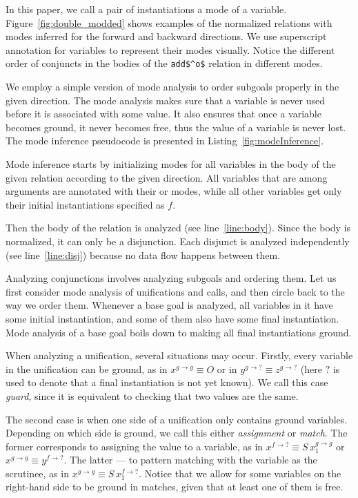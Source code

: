 In this paper, we call a pair of instantiations a mode of a variable.
Figure~\ref{fig:double_modded} shows examples of the normalized \mk relations with modes inferred for the forward and backward directions.
We use superscript annotation for variables to represent their modes visually.
Notice the different order of conjuncts in the bodies of the \lstinline{add$^o$} relation in different modes.


We employ a simple version of mode analysis to order subgoals properly in the given direction.
The mode analysis makes sure that a variable is never used before it is associated with some value.
It also ensures that once a variable becomes ground, it never becomes free, thus the value of a variable is never lost.
The mode inference pseudocode is presented in Listing~\ref{fig:modeInference}.






Mode inference starts by initializing modes for all variables in the body of the given relation according to the given direction.
All variables that are among arguments are annotated with their \inm or \outm modes, while all other variables get only their initial instantiations specified as $f$.

Then the body of the relation is analyzed (see line~\ref{line:body}).
Since the body is normalized, it can only be a disjunction.
Each disjunct is analyzed independently (see line~\ref{line:disj}) because no data flow happens between them.

Analyzing conjunctions involves analyzing subgoals and ordering them.
Let us first consider mode analysis of unifications and calls, and then circle back to the way we order them.
Whenever a base goal is analyzed, all variables in it have some initial instantiation, and some of them also have some final instantiation.
Mode analysis of a base goal boils down to making all final instantiations ground.

When analyzing a unification, several situations may occur.
Firstly, every variable in the unification can be ground, as in $x^{g \rightarrow g} \equiv O$ or in $y^{g \rightarrow ?} \equiv z^{g \rightarrow ?}$ (here $?$ is used to denote that a final instantiation is not yet known).
We call this case \emph{guard}, since it is equivalent to checking that two values are the same.

The second case is when one side of a unification only contains ground variables.
Depending on which side is ground, we call this either \emph{assignment} or \emph{match}.
The former corresponds to assigning the value to a variable, as in $x^{f \rightarrow ?} \equiv S \, x_1^{g \rightarrow g}$ or $x^{g \rightarrow g} \equiv y^{f \rightarrow ?}$.
The latter --- to pattern matching with the variable as the scrutinee, as in $x^{g \rightarrow g} \equiv S \, x_1^{f \rightarrow ?}$.
Notice that we allow for some variables on the right-hand side to be ground in matches, given that at least one of them is free.


